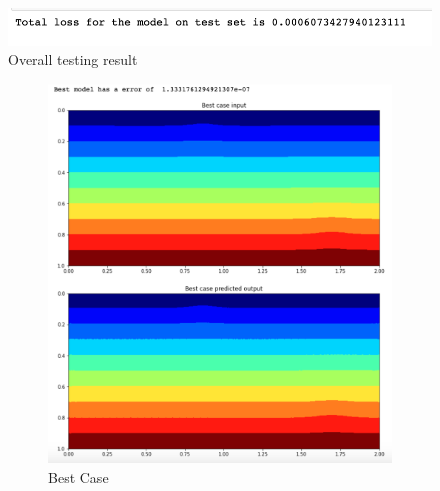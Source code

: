 \begin{figure}[H]
    \caption{Overall testing result}
    \includegraphics[scale=0.8]{figures/mantle_convection_images/larger_dataset_interpolated/ConvAE_OverallTesting.png}
\end{figure}

\begin{figure}[H]
\centering
\begin{subfigure}{0.45\textwidth}
    \includegraphics[width=\textwidth]{figures/mantle_convection_images/larger_dataset_interpolated/ConvAE_Best.png}
    \caption{Best Case}
    \label{fig:first}
\end{subfigure}
\hfill
\begin{subfigure}{0.45\textwidth}

\end{subfigure}
\end{figure}
